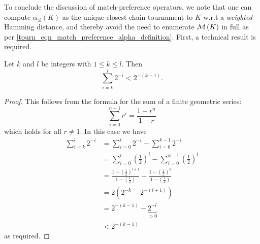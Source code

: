 

To conclude the discussion of match-preference operators, we note that one can
compute $\alpha_{\trianglelefteq}(K)$ as the unique closest chain tournament to
$K$ w.r.t a \emph{weighted} Hamming distance, and thereby avoid the need to
enumerate $\operatorname{\mathcal{M}}\left({K}\right)$ in full as per
\cref{tourn_eqn_match_preference_alpha_definition}. First, a technical result
is required.

\begin{lemma}
   \label{tourn_result_powertwo}

   Let $k$ and $l$ be integers with $1 \le k \le l$. Then
   \[ \sum_{i=k}^{l}{2^{-i}} < 2^{-(k - 1)}. \]

\end{lemma}

\begin{proof}

    This follows from the formula for the sum of a finite geometric
    series:
    \[
        \sum_{i=0}^{n-1}{r^i} = \frac{1-r^n}{1-r}
    \]
    which holds for all $r \ne 1$. In this case we have
    \begin{align*}
        \sum_{i=k}^{l}{2^{-i}}
        &= \sum_{i=0}^{l}{2^{-i}} - \sum_{i=0}^{k-1}{2^{-i}} \\
        &= \sum_{i=0}^{l}{\left(\frac{1}{2}\right)^i}
           -
           \sum_{i=0}^{k - 1}{\left(\frac{1}{2}\right)^i} \\
        &= \frac{
               1 - \left(\frac{1}{2}\right)^{l+1}
           }{
               1 - \left(\frac{1}{2}\right)
           }
           -
           \frac{
               1 - \left(\frac{1}{2}\right)^k
           }{
               1 - \left(\frac{1}{2}\right)
           } \\
        &= 2 \left(
           2^{-k} - 2^{-(l+1)}
        \right) \\
        &= 2^{-(k-1)} - \underbrace{2^{-l}}_{> 0} \\
        &< 2^{-(k-1)}
    \end{align*}
    as required.
\end{proof}

